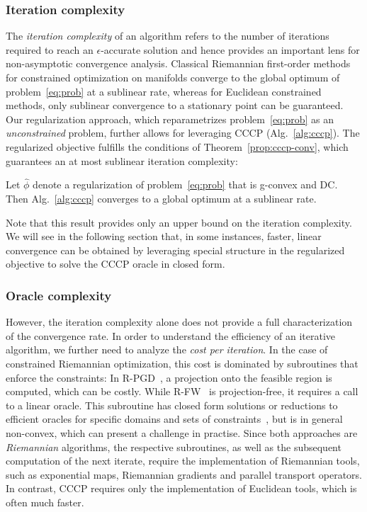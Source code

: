 \documentclass[sn-nature]{sn-jnl}%
\theoremstyle{thmstyleone}%
\theoremstyle{thmstyletwo}%
\theoremstyle{thmstylethree}%
\begin{document}
\subsubsection{Iteration complexity}
The \emph{iteration complexity} of an algorithm refers to the number of iterations required to reach an $\epsilon$-accurate solution and hence provides an important lens for non-asymptotic convergence analysis. Classical Riemannian first-order methods~\citep{frank-wolfe,liu2019simple} for constrained optimization on manifolds converge to the global optimum of problem~\ref{eq:prob} at a sublinear rate, whereas for Euclidean constrained methods, only sublinear convergence to a stationary point can be guaranteed. Our regularization approach, which reparametrizes problem~\ref{eq:prob} as an \emph{unconstrained} problem, further allows for leveraging CCCP (Alg.~\ref{alg:cccp}). The regularized objective fulfills the conditions of Theorem~\ref{prop:cccp-conv}, which guarantees an at most sublinear iteration complexity:
%
\begin{corollary}
    Let $\hat{\phi}$ denote a regularization of problem~\ref{eq:prob} that is g-convex and DC. Then Alg.~\ref{alg:cccp} converges to a global optimum at a sublinear rate.
\end{corollary}
%
Note that this result provides only an upper bound on the iteration complexity. We will see in the following section that, in some instances, faster, linear convergence can be obtained by leveraging special structure in the regularized objective to solve the CCCP oracle in closed form. %


\subsubsection{Oracle complexity}
However, the iteration complexity alone does not provide a full characterization of the convergence rate. In order to understand the efficiency of an iterative algorithm, we further need to analyze the \emph{cost per iteration}. In the case of constrained Riemannian optimization, this cost is dominated by subroutines that enforce the constraints: In R-PGD~\citep{liu2019simple}, a projection onto the feasible region is computed, which can be costly. While R-FW~\citep{frank-wolfe} is projection-free, it requires a call to a linear oracle. This subroutine has closed form solutions or reductions to efficient oracles for specific domains and sets of constraints~\citep{frank-wolfe,scieur2023strong}, but is in general non-convex, which can present a challenge in practise. Since both approaches are \emph{Riemannian} algorithms, the respective subroutines, as well as the subsequent computation of the next iterate, require the implementation of Riemannian tools, such as exponential maps, Riemannian gradients and parallel transport operators. In contrast, CCCP requires only the implementation of Euclidean tools, which is often much faster. %
\end{document}

